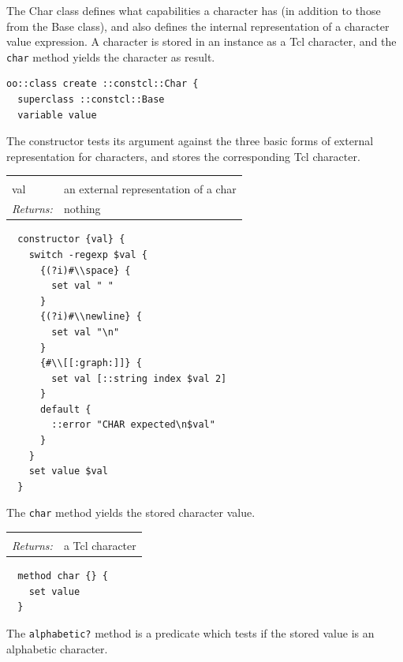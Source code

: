 \documentclass[a5paper,draft]{memoir}
\begin{document}
The Char class defines what capabilities a character has (in addition to those from the Base class), and also defines the internal representation of a character value expression. A character is stored in an instance as a Tcl character, and the \texttt{char} method yields the character as result.

\begin{lstlisting}
oo::class create ::constcl::Char {
  superclass ::constcl::Base
  variable value
\end{lstlisting}

The constructor tests its argument against the three basic forms of external representation for characters, and stores the corresponding Tcl character.

\noindent\begin{tabular}{ |p{1.9cm} p{6.5cm}| }
\hline
\rowcolor[HTML]{CCCCCC} \multicolumn{2}{|l|}{\textbf{Char constructor (internal)}} \\
val & an external representation of a char \\
\textit{Returns:} & nothing \\
\hline
\end{tabular}

\begin{lstlisting}
  constructor {val} {
    switch -regexp $val {
      {(?i)#\\space} {
        set val " "
      }
      {(?i)#\\newline} {
        set val "\n"
      }
      {#\\[[:graph:]]} {
        set val [::string index $val 2]
      }
      default {
        ::error "CHAR expected\n$val"
      }
    }
    set value $val
  }
\end{lstlisting}

The \texttt{char} method yields the stored character value.

\noindent\begin{tabular}{ |p{1.9cm} p{6.5cm}| }
\hline
\rowcolor[HTML]{CCCCCC} \multicolumn{2}{|l|}{\textbf{(Char instance) char (internal)}} \\
\textit{Returns:} & a Tcl character \\
\hline
\end{tabular}

\begin{lstlisting}
  method char {} {
    set value
  }
\end{lstlisting}

The \texttt{alphabetic?} method is a predicate which tests if the stored value is an alphabetic character.
\end{document}
